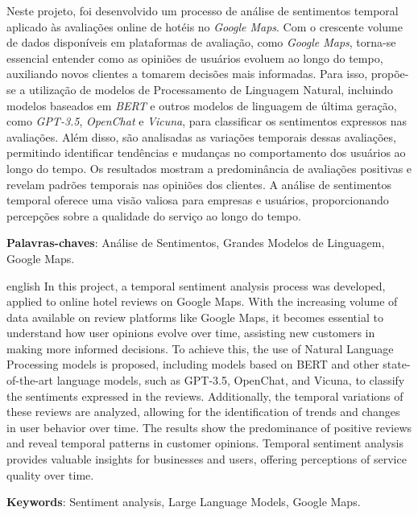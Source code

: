 
\setlength{\absparsep}{18pt} %
\begin{resumo}

Neste projeto, foi desenvolvido um processo de análise de sentimentos temporal aplicado às avaliações online de hotéis no \textit{Google Maps}. Com o crescente volume de dados disponíveis em plataformas de avaliação, como \textit{Google Maps}, torna-se essencial entender como as opiniões de usuários evoluem ao longo do tempo, auxiliando novos clientes a tomarem decisões mais informadas. Para isso, propõe-se a utilização de modelos de Processamento de Linguagem Natural, incluindo modelos baseados em \textit{BERT} e outros modelos de linguagem de última geração, como \textit{GPT-3.5}, \textit{OpenChat} e \textit{Vicuna}, para classificar os sentimentos expressos nas avaliações. Além disso, são analisadas as variações temporais dessas avaliações, permitindo identificar tendências e mudanças no comportamento dos usuários ao longo do tempo. Os resultados mostram a predominância de avaliações positivas e revelam padrões temporais nas opiniões dos clientes. A análise de sentimentos temporal oferece uma visão valiosa para empresas e usuários, proporcionando percepções sobre a qualidade do serviço ao longo do tempo.

 \textbf{Palavras-chaves}: Análise de Sentimentos, Grandes Modelos de Linguagem, Google Maps.
\end{resumo}

\begin{resumo}[Abstract]
 \begin{otherlanguage*}{english}
In this project, a temporal sentiment analysis process was developed, applied to online hotel reviews on Google Maps. With the increasing volume of data available on review platforms like Google Maps, it becomes essential to understand how user opinions evolve over time, assisting new customers in making more informed decisions. To achieve this, the use of Natural Language Processing models is proposed, including models based on BERT and other state-of-the-art language models, such as GPT-3.5, OpenChat, and Vicuna, to classify the sentiments expressed in the reviews. Additionally, the temporal variations of these reviews are analyzed, allowing for the identification of trends and changes in user behavior over time. The results show the predominance of positive reviews and reveal temporal patterns in customer opinions. Temporal sentiment analysis provides valuable insights for businesses and users, offering perceptions of service quality over time.
   \vspace{\onelineskip}
 
   \noindent 
   \textbf{Keywords}: Sentiment analysis, Large Language Models, Google Maps.
 \end{otherlanguage*}
\end{resumo}